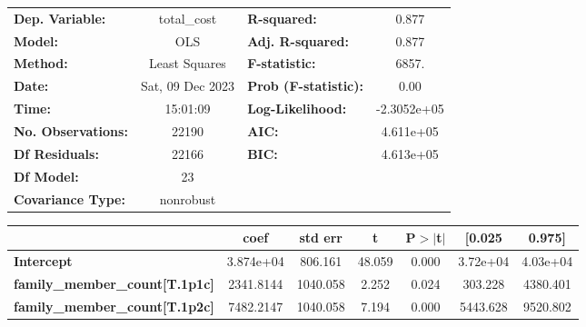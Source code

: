 \documentclass{report}
\begin{document}
\begin{center}
\begin{tabular}{lclc}
\toprule
\textbf{Dep. Variable:}                                       &   total\_cost    & \textbf{  R-squared:         } &      0.877   \\
\textbf{Model:}                                               &       OLS        & \textbf{  Adj. R-squared:    } &      0.877   \\
\textbf{Method:}                                              &  Least Squares   & \textbf{  F-statistic:       } &      6857.   \\
\textbf{Date:}                                                & Sat, 09 Dec 2023 & \textbf{  Prob (F-statistic):} &      0.00    \\
\textbf{Time:}                                                &     15:01:09     & \textbf{  Log-Likelihood:    } & -2.3052e+05  \\
\textbf{No. Observations:}                                    &       22190      & \textbf{  AIC:               } &  4.611e+05   \\
\textbf{Df Residuals:}                                        &       22166      & \textbf{  BIC:               } &  4.613e+05   \\
\textbf{Df Model:}                                            &          23      & \textbf{                     } &              \\
\textbf{Covariance Type:}                                     &    nonrobust     & \textbf{                     } &              \\
\bottomrule
\end{tabular}
\begin{tabular}{lcccccc}
                                                              & \textbf{coef} & \textbf{std err} & \textbf{t} & \textbf{P$> |$t$|$} & \textbf{[0.025} & \textbf{0.975]}  \\
\midrule
\textbf{Intercept}                                            &    3.874e+04  &      806.161     &    48.059  &         0.000        &     3.72e+04    &     4.03e+04     \\
\textbf{family\_member\_count[T.1p1c]}                        &    2341.8144  &     1040.058     &     2.252  &         0.024        &      303.228    &     4380.401     \\
\textbf{family\_member\_count[T.1p2c]}                        &    7482.2147  &     1040.058     &     7.194  &         0.000        &     5443.628    &     9520.802     \\

\end{tabular}
\end{center}
\end{document}
